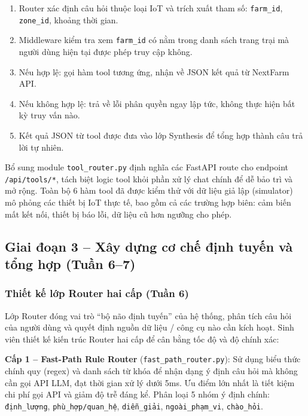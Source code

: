 \begin{enumerate}
    \item Router xác định câu hỏi thuộc loại IoT và trích xuất tham số: \texttt{farm\_id}, \texttt{zone\_id}, khoảng thời gian.
    \item Middleware kiểm tra xem \texttt{farm\_id} có nằm trong danh sách trang trại mà người dùng hiện tại được phép truy cập không.
    \item Nếu hợp lệ: gọi hàm tool tương ứng, nhận về JSON kết quả từ NextFarm API.
    \item Nếu không hợp lệ: trả về lỗi phân quyền ngay lập tức, không thực hiện bất kỳ truy vấn nào.
    \item Kết quả JSON từ tool được đưa vào lớp Synthesis để tổng hợp thành câu trả lời tự nhiên.
\end{enumerate}

Bổ sung module \texttt{tool\_router.py} định nghĩa các FastAPI route cho endpoint \texttt{/api/tools/*}, tách biệt logic tool khỏi phần xử lý chat chính để dễ bảo trì và mở rộng. Toàn bộ 6 hàm tool đã được kiểm thử với dữ liệu giả lập (simulator) mô phỏng các thiết bị IoT thực tế, bao gồm cả các trường hợp biên: cảm biến mất kết nối, thiết bị báo lỗi, dữ liệu cũ hơn ngưỡng cho phép.

\subsection{Giai đoạn 3 -- Xây dựng cơ chế định tuyến và tổng hợp (Tuần 6--7)}

\subsubsection{Thiết kế lớp Router hai cấp (Tuần 6)}

Lớp Router đóng vai trò ``bộ não định tuyến'' của hệ thống, phân tích câu hỏi của người dùng và quyết định nguồn dữ liệu / công cụ nào cần kích hoạt. Sinh viên thiết kế kiến trúc Router hai cấp để cân bằng tốc độ và độ chính xác:

\textbf{Cấp 1 -- Fast-Path Rule Router} (\texttt{fast\_path\_router.py}): Sử dụng biểu thức chính quy (regex) và danh sách từ khóa để nhận dạng ý định câu hỏi mà không cần gọi API LLM, đạt thời gian xử lý dưới 5ms. Ưu điểm lớn nhất là tiết kiệm chi phí gọi API và giảm độ trễ đáng kể. Phân loại 5 nhóm ý định chính: \texttt{định\_lượng}, \texttt{phù\_hợp/quan\_hệ}, \texttt{diễn\_giải}, \texttt{ngoài\_phạm\_vi}, \texttt{chào\_hỏi}.

